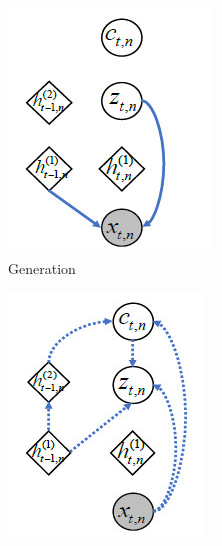 \documentclass[letterpaper,12pt]{article}
\begin{document}
\begin{figure}[htbp]
\begin{subfigure}{0.19\textwidth}
				\includegraphics[width=\linewidth]{Switching/Generation}
				\captionsetup{font=scriptsize}
				\caption{Generation}
				\label{fig: Generation}
			\end{subfigure}
			\begin{subfigure}{0.19\textwidth}
				\includegraphics[width=\linewidth]{Switching/Inference}

\end{subfigure}
\end{figure}
\end{document}

